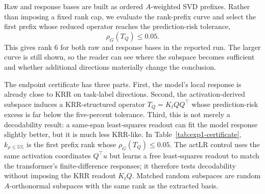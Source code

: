 \documentclass[11pt]{article}
\begin{document}
Raw and response bases are built as ordered \(A\)-weighted SVD prefixes. Rather than imposing a
fixed rank cap, we evaluate the rank-prefix curve and select the first prefix whose reduced
operator reaches the prediction-risk tolerance,
\[
\rho_G(T_Q)\le0.05.
\]
This gives rank \(6\) for both raw and response bases in the reported run. The larger curve is still
shown, so the reader can see where the subspace becomes sufficient and whether additional
directions materially change the conclusion.

The endpoint certificate has three parts. First, the model's local response is already close to
KRR on task-label directions. Second, the activation-derived subspace induces a KRR-structured
operator \(T_Q=K_tQQ^\top\) whose prediction-risk excess is far below the five-percent tolerance.
Third, this is not merely a decodability result: a same-span least-squares readout can fit the
model response slightly better, but it is much less KRR-like.
In Table~\ref{tab:exp1-certificate}, \(k_{\rho\le5\%}\) is the first prefix rank whose
\(\rho_G(T_Q)\le0.05\). The actLR control uses the same activation coordinates \(Q^\top u\) but
learns a free least-squares readout to match the transformer's finite-difference responses; it
therefore tests decodability without imposing the KRR readout \(K_tQ\). Matched random subspaces
are random \(A\)-orthonormal subspaces with the same rank as the extracted basis.
\end{document}
